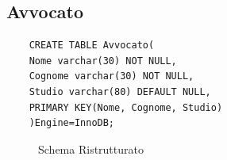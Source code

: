 \documentclass{elegantbook}
\begin{document}
\subsection{Avvocato}
\begin{verbatim}
	CREATE TABLE Avvocato(
	Nome varchar(30) NOT NULL,
	Cognome varchar(30) NOT NULL,
	Studio varchar(80) DEFAULT NULL,
	PRIMARY KEY(Nome, Cognome, Studio)
	)Engine=InnoDB;
\end{verbatim}
\begin{figure}[H]
	\centering
	\caption{Schema Ristrutturato}
\end{figure}
\end{document}
